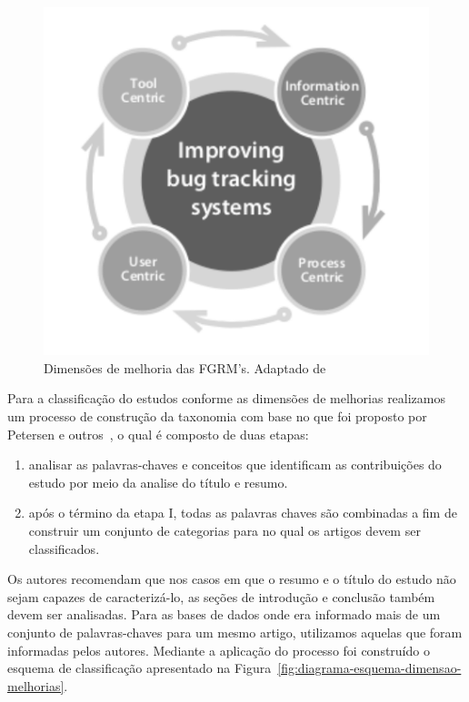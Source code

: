 \begin{figure}[htpb] \centering
	\includegraphics[width=0.666666\linewidth]
	{chapter-intro/img/dimensoes_melhorias_fgrm.pdf}
	\caption{Dimensões de melhoria das FGRM's. Adaptado
		de~\cite{zimmermann2005mining}}\label{fig:dimensoes_melhorias_fgrm}
\end{figure}


Para a classificação do estudos conforme as dimensões de melhorias realizamos um
processo de construção da taxonomia com base no que foi proposto por Petersen e
outros~\cite{Petersen2008}, o qual é composto de duas etapas:

\begin{enumerate}[I]
	\item analisar as palavras-chaves e conceitos que
		identificam as contribuições do estudo por meio da analise do título e
		resumo.
	\item após o término da etapa I, todas as palavras chaves são
		combinadas a fim de construir um conjunto de categorias para no qual os
		artigos devem ser classificados.
\end{enumerate}

Os autores recomendam que nos casos em que o resumo e o título do estudo não
sejam capazes de caracterizá-lo, as seções de introdução e conclusão também
devem ser analisadas. Para as bases de dados onde era informado mais de um
conjunto de palavras-chaves para um mesmo artigo, utilizamos aquelas que foram
informadas pelos autores. Mediante a aplicação do processo foi construído o
esquema de classificação apresentado na
Figura~\ref{fig:diagrama-esquema-dimensao-melhorias}.


